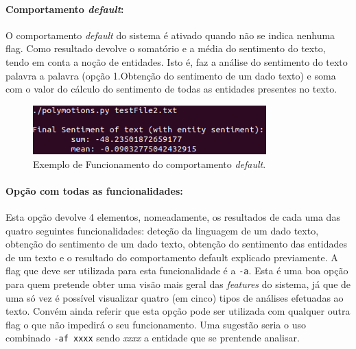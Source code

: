 \documentclass{article}
\begin{document}
\paragraph{Comportamento \textit{default}:} O comportamento \textit{default} do sistema é ativado quando não se indica nenhuma flag. Como resultado devolve o somatório e a média do sentimento do texto, tendo em conta a noção de entidades. Isto é, faz a análise do sentimento do texto palavra a palavra (opção 1.Obtenção do sentimento de um dado texto) e soma com o valor do cálculo do sentimento de todas as entidades presentes no texto.
\begin{figure}[H]
\begin{center}
    \includegraphics[width = 9cm, keepaspectratio]{Pictures/default.png}
    \caption{Exemplo de Funcionamento do comportamento \textit{default}. }
    \label{fig:doption}
\end{center}
\end{figure}

\paragraph{Opção com todas as funcionalidades:} Esta opção devolve 4 elementos, nomeadamente, os resultados de cada uma das quatro seguintes funcionalidades: deteção da linguagem de um dado texto, obtenção do sentimento de um dado texto, obtenção do sentimento das entidades de um texto e o resultado do comportamento default explicado previamente. A flag que deve ser utilizada para esta funcionalidade é a \verb|-a|. Esta é uma boa opção para quem pretende obter uma visão mais geral das \textit{features} do sistema, já que de uma só vez é possível visualizar quatro (em cinco) tipos de análises efetuadas ao texto. Convém ainda referir que esta opção pode ser utilizada com qualquer outra flag o que não impedirá o seu funcionamento. Uma sugestão seria o uso combinado \verb|-af xxxx| sendo \textit{xxxx} a entidade que se prentende analisar.
\end{document}
